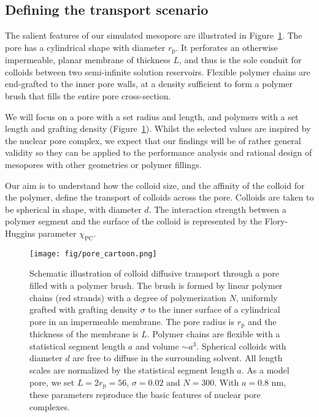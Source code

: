\documentclass[12pt, a4paper]{article}
\begin{document}
\subsection{Defining the transport scenario}

The salient features of our simulated mesopore are illustrated in Figure~\ref{fig:colloid_transport}.
The pore has a cylindrical shape with diameter $r_{\text{p}}$.
It perforates an otherwise impermeable, planar membrane of thickness $L$, and thus is the sole conduit for colloids between two semi-infinite solution reservoirs.
Flexible polymer chains are end-grafted to the inner pore walls, at a density sufficient to form a polymer brush that fills the entire pore cross-section.

We will focus on a pore with a set radius and length, and polymers with a set length and grafting density (Figure~\ref{fig:colloid_transport}).
Whilst the selected values are inspired by the nuclear pore complex, we expect that our findings will be of rather general validity so they can be applied to the performance analysis and rational design of mesopores with other geometries or polymer fillings.

Our aim is to understand how the colloid size, and the affinity of the colloid for the polymer, define the transport of colloids across the pore.
Colloids are taken to be spherical in shape, with diameter $d$.
The interaction strength between a polymer segment and the surface of the colloid is represented by the Flory-Huggins parameter $\chi_{\text{PC}}$.

\begin{figure}
    \centering
    \texttt{[image: fig/pore\_cartoon.png]}
    \caption{
        Schematic illustration of colloid diffusive transport through a pore filled with a polymer brush. 
        The brush is formed by linear polymer chains (red strands) with a degree of polymerization $N$, uniformly grafted with grafting density $\sigma$ 
        to the inner surface of a cylindrical pore in an impermeable membrane.
        The pore radius is $r_{\text{p}}$ and the thickness of the membrane is $L$.
        Polymer chains are flexible with a statistical segment length $a$ and volume $\sim a^3$. 
        Spherical colloids with diameter $d$ are free to diffuse in the surrounding solvent.
        All length scales are normalized by the statistical segment length $a$.
        As a model pore, we set $L = 2r_{\text{p}} = 56$, $\sigma = 0.02$ and $N = 300$.
        With $a = 0.8 {\text{ nm}}$, these parameters reproduce the basic features of nuclear pore complexes.
          }
    \label{fig:colloid_transport}
\end{figure}
\end{document}
